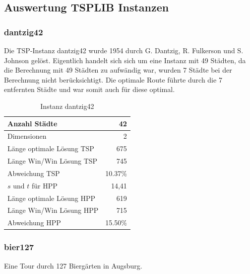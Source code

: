 \documentclass[11pt,a4paper]{article}
\begin{document}
\subsection{Auswertung TSPLIB Instanzen}

\subsubsection{dantzig42}
Die TSP-Instanz dantzig42 wurde 1954 durch G. Dantzig, R. Fulkerson und S. Johnson gelöst. Eigentlich handelt sich sich um eine Instanz mit 49 Städten, da die Berechnung mit 49 Städten zu aufwändig war, wurden 7 Städte bei der Berechnung nicht berücksichtigt. Die optimale Route führte durch die 7 entfernten Städte und war somit auch für diese optimal.

        \begin{table}[H]
                \centering
                \begin{tabular}{| l | r |}
                    \hline
                        Anzahl Städte               & 42            \\ \hline
                        Dimensionen                 & 2             \\ \hline
                        Länge optimale Lösung TSP   & 675           \\ \hline
                        Länge Win/Win Lösung  TSP   & 745           \\ \hline
                        Abweichung TSP              & 10.37\%       \\ \hline
                        $s$ und $t$ für HPP         & 14,41         \\ \hline
                        Länge optimale Lösung HPP   & 619           \\ \hline
                        Länge Win/Win Lösung  HPP   & 715           \\ \hline
                        Abweichung HPP              & 15.50\%       \\ \hline
                \end{tabular}
                \caption{Instanz dantzig42}
                \label{tab:dantzig42}
        \end{table}

\subsubsection{bier127}
Eine Tour durch 127 Biergärten in Augsburg.
\end{document}

